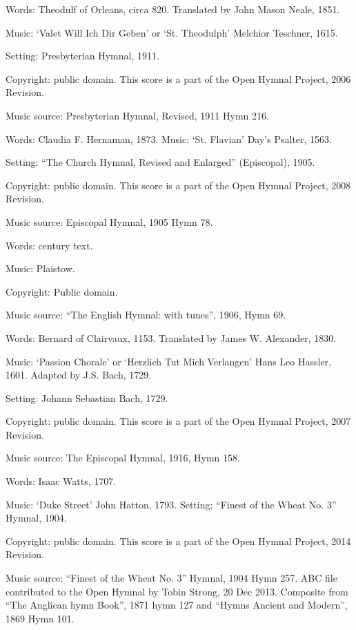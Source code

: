 \begin{multicols}{2}
\par\noindent
Words: Theodulf of Orleans, circa 820. Translated by John Mason Neale, 1851.  
\par\noindent
Music: `Valet Will Ich Dir Geben' or `St. Theodulph' Melchior Teschner, 1615. 
\par\noindent
Setting: Presbyterian Hymnal, 1911.
\par\noindent
Copyright: public domain. This score is a part of the Open Hymnal Project, 2006 Revision.
\par\noindent
Music source: Presbyterian Hymnal, Revised, 1911 Hymn 216.

\par\noindent
Words: Claudia F. Hernaman, 1873.  Music: `St. Flavian' Day's Psalter, 1563. 
\par\noindent
Setting: ``The Church Hymnal, Revised and Enlarged'' (Episcopal), 1905.
\par\noindent
Copyright: public domain. This score is a part of the Open Hymnal Project, 2008 Revision.
\par\noindent
Music source: Episcopal Hymnal, 1905 Hymn 78.

\par\noindent
Words:  century text. 
\par\noindent
Music: Plaistow.
\par\noindent
Copyright: Public domain.
\par\noindent
Music source: ``The English Hymnal: with tunes'', 1906, Hymn 69.


\par\noindent
Words: Bernard of Clairvaux, 1153. Translated by James W. Alexander, 1830. 
\par\noindent
Music: `Passion Chorale' or `Herzlich Tut Mich Verlangen' Hans Leo Hassler, 1601. Adapted by J.S. Bach, 1729.  
\par\noindent
Setting: Johann Sebastian Bach, 1729.
\par\noindent
Copyright: public domain. This score is a part of the Open Hymnal Project, 2007 Revision.
\par\noindent
Music source: The Episcopal Hymnal, 1916, Hymn 158.


\par\noindent
Words: Isaac Watts, 1707.
\par\noindent
Music: `Duke Street' John Hatton, 1793.  Setting: ``Finest of the Wheat No. 3'' Hymnal, 1904.
\par\noindent
Copyright: public domain. This score is a part of the Open Hymnal Project, 2014 Revision.
\par\noindent
Music source: ``Finest of the Wheat No. 3'' Hymnal, 1904 Hymn 257.  ABC file contributed to the Open Hymnal by Tobin Strong, 20 Dec 2013. Composite from ``The Anglican hymn Book'', 1871 hymn 127 and ``Hymns Ancient and Modern'', 1869 Hymn 101.


\end{multicols}
